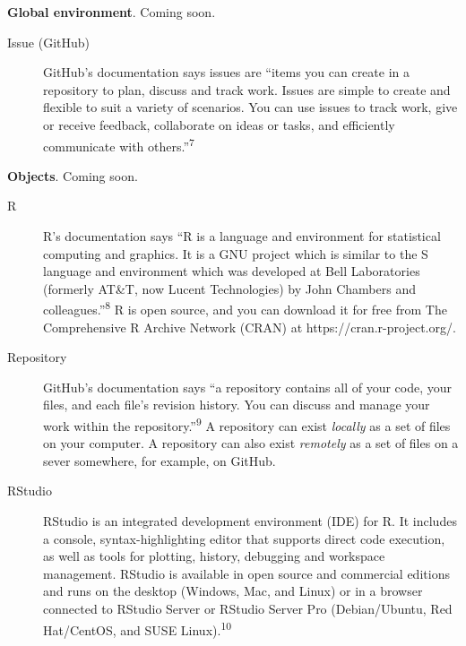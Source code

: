 \documentclass[
  letterpaper,
  DIV=11,
  numbers=noendperiod]{scrreprt}
\begin{document}
\textbf{Global environment}. Coming soon.

\begin{description}
\item[\label{glossary-issue}{Issue (GitHub)}]
GitHub's documentation says issues are ``items you can create in a
repository to plan, discuss and track work. Issues are simple to create
and flexible to suit a variety of scenarios. You can use issues to track
work, give or receive feedback, collaborate on ideas or tasks, and
efficiently communicate with others.''\textsuperscript{7}
\end{description}

\textbf{Objects}. Coming soon.

\begin{description}
\item[\label{glossary-r}{R}]
R's documentation says ``R is a language and environment for statistical
computing and graphics. It is a GNU project which is similar to the S
language and environment which was developed at Bell Laboratories
(formerly AT\&T, now Lucent Technologies) by John Chambers and
colleagues.''\textsuperscript{8} R is open source, and you can download
it for free from The Comprehensive R Archive Network (CRAN) at
https://cran.r-project.org/.
\item[\label{glossary-repository}{Repository}]
GitHub's documentation says ``a repository contains all of your code,
your files, and each file's revision history. You can discuss and manage
your work within the repository.''\textsuperscript{9} A repository can
exist \emph{locally} as a set of files on your computer. A repository
can also exist \emph{remotely} as a set of files on a sever somewhere,
for example, on GitHub.
\item[\label{glossary-rstudio}{RStudio}]
RStudio is an integrated development environment (IDE) for R. It
includes a console, syntax-highlighting editor that supports direct code
execution, as well as tools for plotting, history, debugging and
workspace management. RStudio is available in open source and commercial
editions and runs on the desktop (Windows, Mac, and Linux) or in a
browser connected to RStudio Server or RStudio Server Pro
(Debian/Ubuntu, Red Hat/CentOS, and SUSE Linux).\textsuperscript{10}
\end{description}
\end{document}
